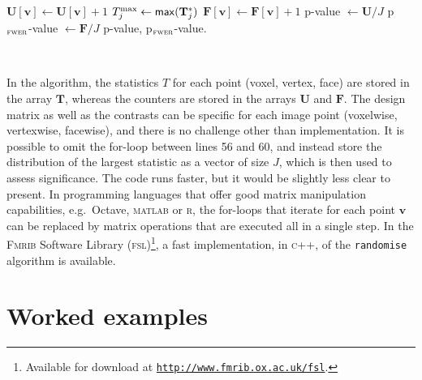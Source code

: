 {\begin{algorithmic}[1]
\State $\mathbf{U}[\mathbf{v}] \leftarrow \mathbf{U}[\mathbf{v}]+1$
\EndIf
\EndFor
\State $T^{\text{max}}_{j} \leftarrow \text{\textsf{max}}(\mathbf{T}_{j}^{*})$
\State $\mathbf{F}[\mathbf{v}] \leftarrow \mathbf{F}[\mathbf{v}]+1$
\EndIf
\EndFor
\EndFor
\State p-value $\leftarrow \mathbf{U} / J$
\State p$_{\text{\textsc{fwer}}}$-value $\leftarrow \mathbf{F} / J$
\State \Return p-value, p$_{\text{\textsc{fwer}}}$-value.
\EndFor
\end{algorithmic}}
\noindent
\HRule\\
\setstretch{\lspac}
\vspace{0mm}

In the algorithm, the statistics $T$ for each point (voxel, vertex, face) are stored in the array $\mathbf{T}$, whereas the counters are stored in the arrays $\mathbf{U}$ and $\mathbf{F}$. The design matrix as well as the contrasts can be specific for each image point (voxelwise, vertexwise, facewise), and there is no challenge other than implementation. It is possible to omit the for-loop between lines 56 and 60, and instead store the distribution of the largest statistic as a vector of size $J$, which is then used to assess significance. The code runs faster, but it would be slightly less clear to present. In programming languages that offer good matrix manipulation capabilities, e.g.\ Octave, \textsc{matlab} or \textsc{r}, the for-loops that iterate for each point $\mathbf{v}$ can be replaced by matrix operations that are executed all in a single step. In the \textsc{Fmrib} Software Library (\textsc{fsl})\footnote{Available for download at \href{http://www.fmrib.ox.ac.uk/fsl}{\texttt{http://www.fmrib.ox.ac.uk/fsl}}.}, a fast implementation, in \textsc{c}++, of the \texttt{randomise} algorithm is available.

\section{Worked examples}
\label{sec:perm:examples}

